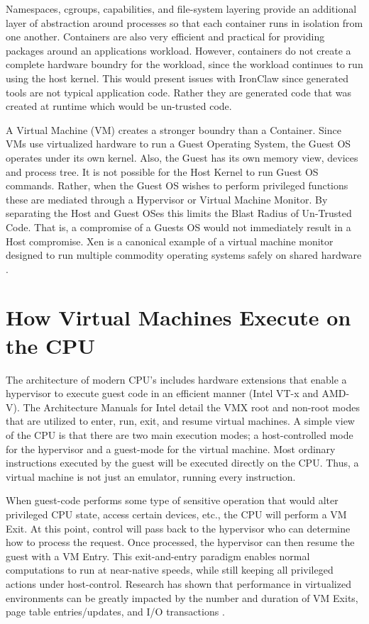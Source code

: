 Namespaces, cgroups, capabilities, and file-system layering provide an additional layer of abstraction around processes so that each container runs in isolation from one another. Containers are also very efficient and practical for providing packages around an applications workload. However, containers do not create a complete hardware boundry for the workload, since the workload continues to run using the host kernel. This would present issues with IronClaw since generated tools are not typical application code. Rather they are generated code that was created at runtime which would be un-trusted code.

A Virtual Machine (VM) creates a stronger boundry than a Container. Since VMs use virtualized hardware to run a Guest Operating System, the Guest OS operates under its own kernel. Also, the Guest has its own memory view, devices and process tree. It is not possible for the Host Kernel to run Guest OS commands. Rather, when the Guest OS wishes to perform privileged functions these are mediated through a Hypervisor or Virtual Machine Monitor. By separating the Host and Guest OSes this limits the Blast Radius of Un-Trusted Code. That is, a compromise of a Guests OS would not immediately result in a Host compromise. Xen is a canonical example of a virtual machine monitor designed to
run multiple commodity operating systems safely on shared hardware
\cite{barham2003xen}.

\section{How Virtual Machines Execute on the CPU}
The architecture of modern CPU’s includes hardware extensions that enable a hypervisor to execute guest code in an efficient manner (Intel VT-x and AMD-V). The Architecture Manuals for Intel detail the VMX root and non-root modes that are utilized to enter, run, exit, and resume virtual machines. A simple view of the CPU is that there are two main execution modes; a host-controlled mode for the hypervisor and a guest-mode for the virtual machine. Most ordinary instructions executed by the guest will be executed directly on the CPU. Thus, a virtual machine is not just an emulator, running every instruction.

When guest-code performs some type of sensitive operation that would alter privileged CPU state, access certain devices, etc., the CPU will perform a VM Exit. At this point, control will pass back to the hypervisor who can determine how to process the request. Once processed, the hypervisor can then resume the guest with a VM Entry. This exit-and-entry paradigm enables normal computations to run at near-native speeds, while still keeping all privileged actions under host-control. Research has shown that performance in virtualized environments can be greatly impacted by the number and duration of VM Exits, page table entries/updates, and I/O transactions \cite{adams2006comparison}.

